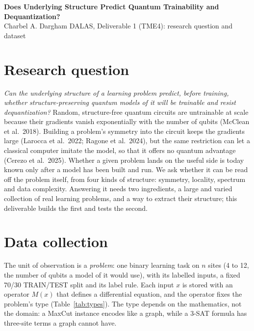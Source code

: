 \documentclass[10pt,a4paper]{article}
\begin{document}
\begin{center}
{\large\bfseries Does Underlying Structure Predict Quantum Trainability and Dequantization?}\\[0.3ex]
{\small Charbel A. Dargham \quad\textperiodcentered\quad DALAS, Deliverable 1 (TME4): research question and dataset}
\end{center}

\section{Research question}

\emph{Can the underlying structure of a learning problem predict, before training, whether structure-preserving
quantum models of it will be trainable and resist dequantization?} Random, structure-free quantum circuits
are untrainable at scale because their gradients vanish exponentially with the number of qubits (McClean et
al.\ 2018). Building a problem's symmetry into the circuit keeps the gradients large (Larocca et al.\ 2022;
Ragone et al.\ 2024), but the same restriction can let a classical computer imitate the model, so that it
offers no quantum advantage (Cerezo et al.\ 2025). Whether a given problem lands on the useful side is today
known only after a model has been built and run. We ask whether it can be read off the problem itself, from
four kinds of structure: symmetry, locality, spectrum and data complexity. Answering it needs two
ingredients, a large and varied collection of real learning problems, and a way to extract their structure;
this deliverable builds the first and tests the second.

\section{Data collection}

The unit of observation is a \emph{problem}: one binary learning task on $n$ sites (4 to 12, the number of
qubits a model of it would use), with its labelled inputs, a fixed 70/30 TRAIN/TEST split and its label rule.
Each input $x$ is stored with an operator $M(x)$ that defines a differential equation, and the operator fixes
the problem's type (Table~\ref{tab:types}). The type depends on the mathematics, not the domain: a MaxCut
instance encodes like a graph, while a 3-SAT formula has three-site terms a graph cannot have.
\end{document}
